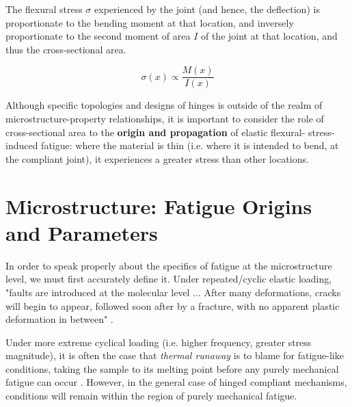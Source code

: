 \documentclass{report}
\newcommand{\myuline}[1]{%
  \uline{\phantom{#1}}%
  \llap{\contour{white}{#1}}%
}
\begin{document}
The flexural stress $\sigma$ experienced by the joint (and hence, the deflection) is 
proportionate to the bending moment at that location, and inversely proportionate to 
the second moment of area $I$ of the joint at that location, and thus the cross-sectional area.

\begin{equation}
    \sigma (x) \propto \frac {M(x)}{I(x)}
\end{equation}

Although specific topologies and designs of hinges is outside of the realm of 
microstructure-property relationships, it is important to consider the role of 
cross-sectional area to the \textbf{origin and propagation} of elastic flexural-
stress-induced fatigue: where the material is thin (i.e. where it is intended to bend, 
at the compliant joint), it experiences a greater stress than other locations.

\section{Microstructure: Fatigue Origins and Parameters}

In order to speak properly about the specifics of fatigue at the microstructure level, 
we must first accurately define it. Under repeated/cyclic elastic loading, "faults are 
introduced at the molecular level ... After many deformations, 
cracks will begin to appear, followed soon after by a fracture, with no apparent plastic 
deformation in between" \cite{fatigue}.

Under more extreme cyclical loading (i.e. higher frequency, greater stress magnitude), 
it is often the case that \textit{thermal runaway} is to blame for fatigue-like conditions,
taking the sample to its melting point before any purely mechanical fatigue can occur \cite{CHANDRAN2016222}.
However, in the general case of hinged compliant mechanisms, conditions will remain within
the region of purely mechanical fatigue.

\end{document}
